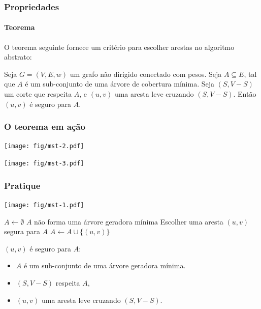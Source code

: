 \documentclass{beamer}
\begin{document}
\begin{frame}
\frametitle{Propriedades}
\framesubtitle{Teorema}

O teorema seguinte fornece um critério para escolher arestas
no algoritmo abstrato:
\begin{theorem}
Seja $G = (V, E, w)$ um grafo não dirigido conectado com pesos. 
Seja $A \subseteq E$, tal que $A$ é um sub-conjunto de uma árvore de
cobertura mínima. Seja $(S, V-S)$ um corte que respeita $A$, e $(u, v)$
uma aresta leve cruzando $(S, V-S)$. Então $(u, v)$ é seguro para $A$.
\end{theorem}
\end{frame}

\begin{frame}
\frametitle{O teorema em ação}

\begin{center}
\texttt{[image: fig/mst-2.pdf]}
\end{center}

\begin{center}
\texttt{[image: fig/mst-3.pdf]}
\end{center}

\end{frame}

\begin{frame}
\frametitle{Pratique}
\begin{center}
\texttt{[image: fig/mst-1.pdf]}
\end{center}
\begin{codebox}
\zi $A \gets \emptyset$
\zi \While $A$ não forma uma árvore geradora mínima
\zi \Do Escolher uma aresta $(u, v)$ segura para $A$
\zi   $A \gets A \cup \{ (u, v) \}$
    \End
\end{codebox}

$(u, v)$ é seguro para $A$:
\begin{itemize}
\item $A$ é um sub-conjunto de uma árvore geradora mínima. 
\item $(S, V-S)$ respeita $A$, 
\item $(u, v)$ uma aresta leve cruzando $(S, V-S)$. 
\end{itemize}

\end{frame}
\end{document}
